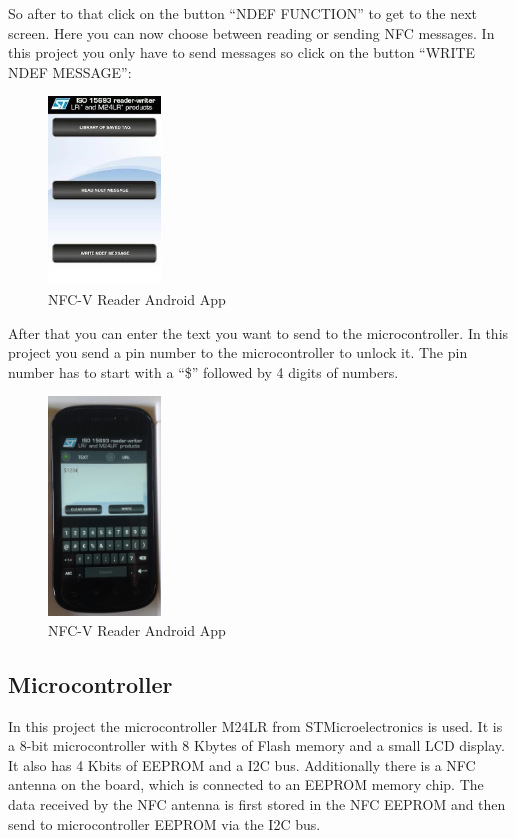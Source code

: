 \documentclass[11pt]{article}
\begin{document}
So after to that click on the button "`NDEF FUNCTION"' to get to the next screen. Here you can now choose between reading or sending NFC messages. In this project you only have to send messages so click on the button "`WRITE NDEF MESSAGE"':

\begin{figure}[H]
 \centering
 \includegraphics [width=3cm]{NFCvreader_screen3.jpg} 
 \caption{NFC-V Reader Android App\cite{cite10}}
\end{figure}

After that you can enter the text you want to send to the microcontroller. In this project you send a pin number to the microcontroller to unlock it. The pin number has to start with a "`\$"' followed by 4 digits of numbers.

\begin{figure}[H]
 \centering
 \includegraphics [width=3cm]{NFCvreader_screen4.jpg} 
 \caption{NFC-V Reader Android App\cite{cite10}}
\end{figure}

\newpage 

\subsection{Microcontroller}

In this project the microcontroller M24LR from STMicroelectronics is used. It is a 8-bit microcontroller with 8 Kbytes of Flash memory and a small LCD display. It also has 4 Kbits of EEPROM and a I2C bus. Additionally there is a NFC antenna on the board, which is connected to an EEPROM memory chip. The data received by the NFC antenna is first stored in the NFC EEPROM and then send to microcontroller EEPROM via the I2C bus.
\end{document}
